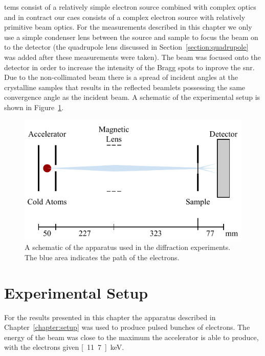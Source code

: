 \Glspl{tem} consist of a relatively simple electron source combined with complex optics and in contract our \gls{caes} consists of a complex electron source with relatively primitive beam optics.
For the measurements described in this chapter we only use a simple condenser lens between the source and sample to focus the beam on to the detector (the quadrupole lens discussed in Section~\ref{section:quadrupole} was added after these measurements were taken).
The beam was focused onto the detector in order to increase the intensity of the Bragg spots to inprove the \gls{snr}.
Due to the non-collimated beam there is a spread of incident angles at the crystalline samples that results in the reflected beamlets possessing the same convergence angle as the incident beam.
A schematic of the experimental setup is shown in Figure~\ref{figure:diffraction_geometry}.

\begin{figure}
    \center
    \includegraphics{part2/Figs/DiffractionGeometry.pdf}
    \caption[A schematic of the apparatus used for diffraction experiments.]{A schematic of the apparatus used in the diffraction experiments. The blue area indicates the path of the electrons.}
    \label{figure:diffraction_geometry}
\end{figure}

\section{Experimental Setup}

For the results presented in this chapter the apparatus described in Chapter~\ref{chapter:setup} was used to produce pulsed bunches of electrons.
The energy of the beam was close to the maximum the accelerator is able to produce, with the electrons given \unit[11.7]{keV}.

